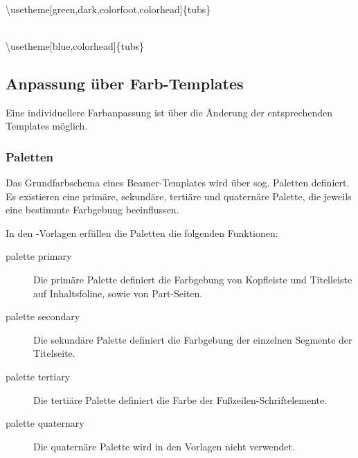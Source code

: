 \begin{center}
\begin{minipage}{0.49\textwidth}
\end{minipage}
\begin{minipage}{0.49\textwidth}
\end{minipage}\medskip\\
{\ttfamily \textbackslash usetheme[green,dark,colorfoot,colorhead]\{tubs\}}
\end{center}

\begin{center}
\begin{minipage}{0.49\textwidth}
\end{minipage}
\begin{minipage}{0.49\textwidth}
\end{minipage}\medskip\\
{\ttfamily%
  \textbackslash usetheme[blue,colorhead]\{tubs\}}
\end{center}

\clearpage
\subsection{Anpassung über Farb-Templates}

Eine individuellere Farbanpassung ist über die Änderung der entsprechenden
Templates möglich.

\subsubsection{Paletten}

Das Grundfarbschema eines Beamer-Templates wird über sog. Paletten definiert.
Es existieren eine primäre, sekundäre, tertiäre und quaternäre Palette,
die jeweils eine bestimmte Farbgebung beeinflussen.

In den \tubslatex-Vorlagen erfüllen die Paletten die folgenden Funktionen:

\begin{description}
  \item[\ttfamily palette primary]
    Die primäre Palette definiert die Farbgebung
    von Kopfleiste und Titelleiste auf Inhaltsfoline,
    sowie von Part-Seiten.
  \item[\ttfamily palette secondary]
    Die sekundäre Palette definiert die Farbgebung der einzelnen
    Segmente der Titelseite.
  \item[\ttfamily palette tertiary]
    Die tertiäre Palette definiert die Farbe der Fußzeilen-Schriftelemente.
  \item[\ttfamily palette quaternary]
    Die quaternäre Palette wird in den Vorlagen nicht verwendet.
\end{description}

